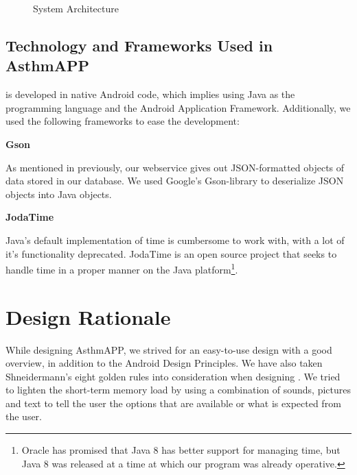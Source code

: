 \begin{figure}
		\centering
		\caption{System Architecture}
		\label{fig:basic-architecture}
\end{figure}

\clearpage{}

\subsection{Technology and Frameworks Used in AsthmAPP}
\label{sec:techandframeinapp}
\app{} is developed in native Android code, which implies using Java as the programming language and the Android Application Framework. Additionally, we used the following frameworks to ease the development: 


\textbf{Gson} 

As mentioned in previously, our webservice gives out JSON-formatted objects of data stored in our database. We used Google's Gson-library to deserialize JSON objects into Java objects.

\textbf{JodaTime} 

Java's default implementation of time is cumbersome to work with, with a lot of it's functionality deprecated. JodaTime is an open source project that seeks to handle time in a proper manner on the Java platform\footnote{Oracle has promised that Java 8 has better support for managing time, but Java 8 was released at a time at which our program was already operative.}.


\section{Design Rationale}
\label{sec:usability-affect-design}
While designing AsthmAPP, we strived for an easy-to-use design with a good overview, in addition to the Android Design Principles\cite{androiddesign}. We have also taken Shneidermann's eight golden rules into consideration when designing \app{}\cite{shneiderman2003designing}. 
We tried to lighten the short-term memory load by using a combination of sounds, pictures and text to tell the user the options that are available or what is expected from the user. 

